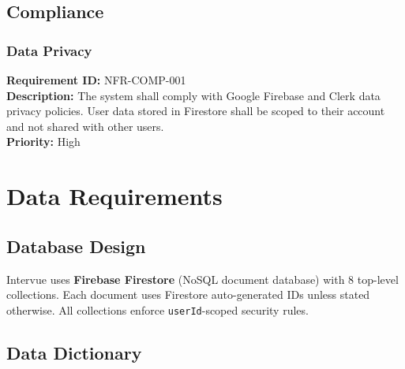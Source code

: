 \documentclass{fisatinternship}
\begin{document}
\section{Compliance}

\subsection{Data Privacy}
\textbf{Requirement ID:} NFR-COMP-001\\
\textbf{Description:} The system shall comply with Google Firebase and Clerk data
privacy policies. User data stored in Firestore shall be scoped to their account and
not shared with other users.\\
\textbf{Priority:} High

\chapter{Data Requirements}

\section{Database Design}
Intervue uses \textbf{Firebase Firestore} (NoSQL document database) with 8 top-level
collections. Each document uses Firestore auto-generated IDs unless stated otherwise.
All collections enforce \texttt{userId}-scoped security rules.

\section{Data Dictionary}
\end{document}
